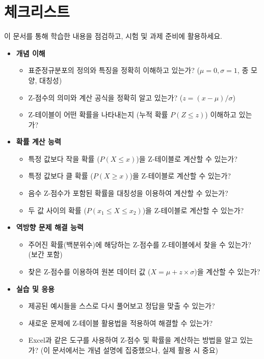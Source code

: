 \documentclass[11pt,a4paper]{book}
\providecommand{\newsection}{\section}
\theoremstyle{definition}
\begin{document}
\newsection*{체크리스트}
이 문서를 통해 학습한 내용을 점검하고, 시험 및 과제 준비에 활용하세요.

\begin{itemize}
    \item \textbf{개념 이해}
    \begin{itemize}
        \item 표준정규분포의 정의와 특징을 정확히 이해하고 있는가? ($\mu=0, \sigma=1$, 종 모양, 대칭성)
        \item Z-점수의 의미와 계산 공식을 정확히 알고 있는가? ($z = (x - \mu) / \sigma$)
        \item Z-테이블이 어떤 확률을 나타내는지 (누적 확률 $P(Z \le z)$) 이해하고 있는가?
    \end{itemize}
    \item \textbf{확률 계산 능력}
    \begin{itemize}
        \item 특정 값보다 작을 확률 ($P(X \le x)$)을 Z-테이블로 계산할 수 있는가?
        \item 특정 값보다 클 확률 ($P(X \ge x)$)을 Z-테이블로 계산할 수 있는가?
        \item 음수 Z-점수가 포함된 확률을 대칭성을 이용하여 계산할 수 있는가?
        \item 두 값 사이의 확률 ($P(x_1 \le X \le x_2)$)을 Z-테이블로 계산할 수 있는가?
    \end{itemize}
    \item \textbf{역방향 문제 해결 능력}
    \begin{itemize}
        \item 주어진 확률(백분위수)에 해당하는 Z-점수를 Z-테이블에서 찾을 수 있는가? (보간 포함)
        \item 찾은 Z-점수를 이용하여 원본 데이터 값 ($X = \mu + z \times \sigma$)을 계산할 수 있는가?
    \end{itemize}
    \item \textbf{실습 및 응용}
    \begin{itemize}
        \item 제공된 예시들을 스스로 다시 풀어보고 정답을 맞출 수 있는가?
        \item 새로운 문제에 Z-테이블 활용법을 적용하여 해결할 수 있는가?
        \item Excel과 같은 도구를 사용하여 Z-점수 및 확률을 계산하는 방법을 알고 있는가? (이 문서에서는 개념 설명에 집중했으나, 실제 활용 시 중요)
    \end{itemize}
\end{itemize}
\end{document}
